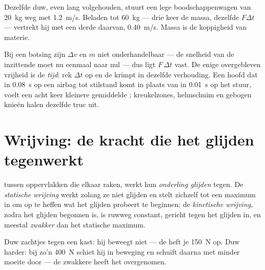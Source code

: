 \begin{example}\label{ex:g11:forces-and-motion:cart}
Dezelfde duw, even lang volgehouden, stuurt een lege boodschappenwagen
van \qty{20}{kg} weg met \qty{1.2}{m/s}. Beladen tot \qty{60}{kg} ---
drie keer de massa, dezelfde $F\Delta t$ --- vertrekt hij met een derde
daarvan, \qty{0.40}{m/s}. Massa is de koppigheid van materie.
\end{example}

\begin{remark}\label{rem:g11:forces-and-motion:airbag}
Bij een botsing zijn $\Delta v$ en $m$ niet onderhandelbaar --- de
snelheid van de inzittende moet nu eenmaal naar nul --- dus ligt
$F\,\Delta t$ vast. De enige overgebleven vrijheid is de \emph{tijd}: rek
$\Delta t$ op en de  krimpt in dezelfde verhouding. Een hoofd dat
in \qty{0.08}{s} op een airbag tot stilstand komt in plaats van in
\qty{0.01}{s} op het stuur, voelt een acht keer kleinere gemiddelde
; kreukelzones, helmschuim en gebogen knieën halen dezelfde truc
uit.
\end{remark}

\section{Wrijving: de kracht die het glijden tegenwerkt}

\begin{definition}\label{def:g11:forces-and-motion:friction}
 tussen oppervlakken die elkaar raken, werkt hun \emph{onderling
glijden} tegen. De \emph{statische wrijving}
werkt zolang ze niet glijden en stelt zichzelf tot een maximum in om op
te heffen wat het glijden probeert te beginnen; de \emph{kinetische
wrijving}, zodra het glijden begonnen is, is
ruwweg constant, gericht tegen het glijden in, en meestal \emph{zwakker}
dan het statische maximum.
\end{definition}

\begin{example}\label{ex:g11:forces-and-motion:wardrobe}
Duw zachtjes tegen een kast: hij beweegt niet --- de 
heft je \qty{150}{N} op. Duw harder: bij zo'n \qty{400}{N} schiet hij in
beweging en schuift daarna met minder moeite door --- de zwakkere
 heeft het overgenomen.
\end{example}

